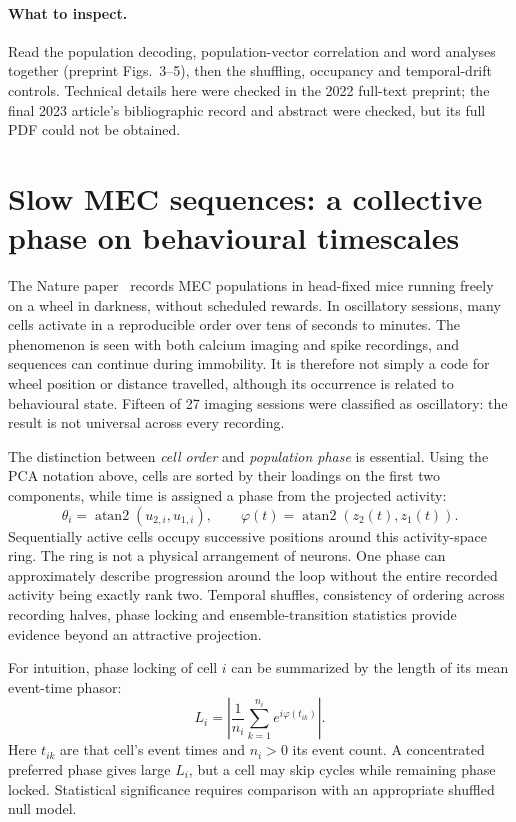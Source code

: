 \documentclass[11pt,a4paper]{article}
\begin{document}
\paragraph{What to inspect.}
Read the population decoding, population-vector correlation and word analyses together (preprint Figs.~3--5), then the shuffling, occupancy and temporal-drift controls. Technical details here were checked in the 2022 full-text preprint; the final 2023 article's bibliographic record and abstract were checked, but its full PDF could not be obtained.

\section{Slow MEC sequences: a collective phase on behavioural timescales}
The Nature paper~\cite{sequences} records MEC populations in head-fixed mice running freely on a wheel in darkness, without scheduled rewards. In oscillatory sessions, many cells activate in a reproducible order over tens of seconds to minutes. The phenomenon is seen with both calcium imaging and spike recordings, and sequences can continue during immobility. It is therefore not simply a code for wheel position or distance travelled, although its occurrence is related to behavioural state. Fifteen of 27 imaging sessions were classified as oscillatory: the result is not universal across every recording.

The distinction between \emph{cell order} and \emph{population phase} is essential. Using the PCA notation above, cells are sorted by their loadings on the first two components, while time is assigned a phase from the projected activity:
\[\theta_i=\operatorname{atan2}(u_{2,i},u_{1,i}),\qquad \varphi(t)=\operatorname{atan2}(z_2(t),z_1(t)).\]
Sequentially active cells occupy successive positions around this activity-space ring. The ring is not a physical arrangement of neurons. One phase can approximately describe progression around the loop without the entire recorded activity being exactly rank two. Temporal shuffles, consistency of ordering across recording halves, phase locking and ensemble-transition statistics provide evidence beyond an attractive projection.

For intuition, phase locking of cell $i$ can be summarized by the length of its mean event-time phasor:
\[L_i=\left|\frac{1}{n_i}\sum_{k=1}^{n_i}e^{i\varphi(t_{ik})}\right|.\]
Here $t_{ik}$ are that cell's event times and $n_i>0$ its event count. A concentrated preferred phase gives large $L_i$, but a cell may skip cycles while remaining phase locked. Statistical significance requires comparison with an appropriate shuffled null model.
\end{document}

